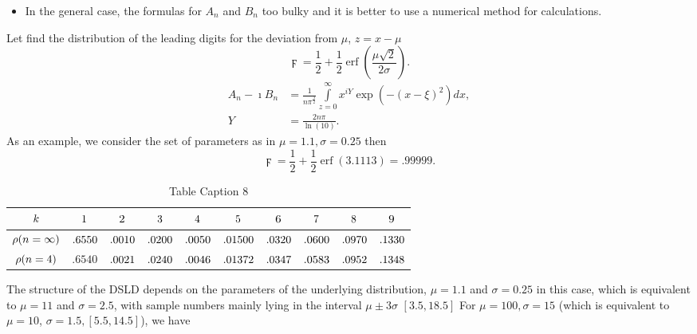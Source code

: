 \documentclass[titlepage,fleqn]{article}%
\begin{document}
\begin{itemize}
\item In the general case, the formulas for $A_{n}$ and $B_{n}$ too bulky and
it is better to use a numerical method for calculations.
\end{itemize}

Let find the distribution of the leading digits for the deviation from $\mu$,
$z=x-\mu$%
\[
\digamma=\frac{1}{2}+\frac{1}{2}\operatorname{erf}\left(  \frac{\mu\sqrt{2}%
}{2\sigma}\right)  .
\]%
\begin{align*}
A_{n}-\imath B_{n}  &  =\frac{1}{n\pi^{\frac{3}{2}}}%
{\displaystyle\int\limits_{z=0}^{\infty}}
x^{iY}\exp\left(  -(x-\xi)^{2}\right)  dx,\\
Y  &  =\frac{2n\pi}{\ln(10)}.
\end{align*}
As an example, we consider the set of parameters as in
\cite{formann0}
$\mu=1.1,\sigma=0.25$ then%
\[
\digamma=\frac{1}{2}+\frac{1}{2}\operatorname{erf}\left(  3.1113\right)
=.99999.
\]%
\begin{table}[!htbp] \centering
\begin{tabular}
[c]{|c|c|c|c|c|c|c|c|c|c|}\hline\hline
${\small k}$ & ${\small 1}$ & ${\small 2}$ & ${\small 3}$ & ${\small 4}$ &
${\small 5}$ & ${\small 6}$ & ${\small 7}$ & ${\small 8}$ & ${\small 9}%
$\\\hline
${\small \rho(n=\infty)}$ & ${\small .6550}$ & ${\small .0010}$ &
${\small .0200}$ & ${\small .0050}$ & ${\small .01500}$ & ${\small .0320}$ &
${\small .0600}$ & ${\small .0970}$ & ${\small .1330}$\\\hline
${\small \rho(n=4)}$ & {\small .}$6540$ & ${\small .0021}$ & ${\small .0240}$
& ${\small .0046}$ & ${\small .01372}$ & ${\small .0347}$ & ${\small .0583}$ &
${\small .0952}$ & ${\small .1348}$\\\hline\hline
\end{tabular}
\caption{Table Caption 8}\label{TableKey8}%
\end{table}%


\bigskip

The structure of the DSLD depends on the parameters of the underlying
distribution, $\mu=1.1$ and $\sigma=0.25$ in this case, which is equivalent to
$\mu=11$ and $\sigma=2.5$, with sample numbers mainly lying in the interval
$\mu\pm3\sigma$ $[3.5,18.5]$ For $\mu=100,\sigma=15$ (which is equivalent to
$\mu=10$, $\sigma=1.5,[5.5,14.5]$), we have
\end{document}
